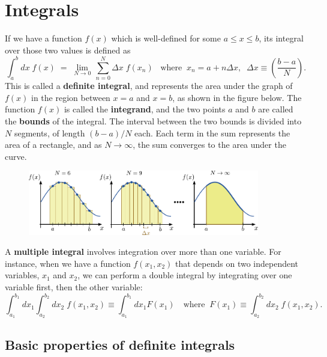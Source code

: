 \documentclass[10pt,a4paper]{article}
\begin{document}
\setcounter{page}{14}

\section{Integrals}
\label{integrals}

If we have a function $f(x)$ which is well-defined for some $a \le x
\le b$, its integral over those two values is defined as
\begin{equation}
  \int_a^b dx\; f(x) \;=\; \lim_{N \rightarrow 0} \, \sum_{n=0}^{N} \Delta x\; f(x_n) \;\;\;\mathrm{where}\;\; x_n = a + n\Delta x, \;\; \Delta x \equiv \left(\frac{b-a}{N}\right).
\end{equation}
This is called a \textbf{definite integral}, and represents the area
under the graph of $f(x)$ in the region between $x=a$ and $x=b$,
as shown in the figure below. The function $f(x)$ is called the
\textbf{integrand}, and the two points $a$ and $b$ are called the
\textbf{bounds} of the integral. The interval between the two bounds is
divided into $N$ segments, of length $(b-a)/N$ each. Each term in
the sum represents the area of a rectangle, and as
$N\rightarrow \infty$, the sum converges to the area under the curve.

\begin{figure}[h]
  \centering\includegraphics[width=0.9\textwidth]{definite_integral}
\end{figure}

A \textbf{multiple integral} involves integration over more than one
variable. For instance, when we have a function $f(x_1,x_2)$ that
depends on two independent variables, $x_1$ and $x_2$, we can
perform a double integral by integrating over one variable first, then
the other variable:
\begin{equation}
\int_{a_1}^{b_1} dx_1 \int_{a_2}^{b_2} dx_2 \; f(x_1, x_2) \equiv \int_{a_1}^{b_1} dx_1 F(x_1)\quad\text{where}\;\;F(x_1) \equiv \int_{a_2}^{b_2} dx_2 \; f(x_1, x_2).
\end{equation}


\subsection{Basic properties of definite integrals}
\label{basic-properties-of-definite-integrals}
\end{document}
